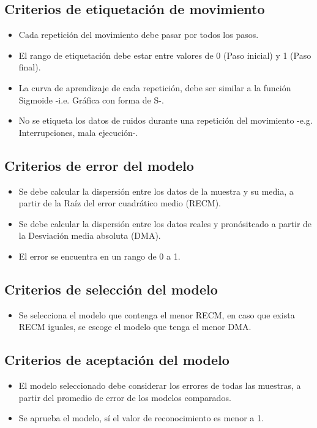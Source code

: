 \subsection{Criterios de etiquetaci\'on de movimiento}
\begin{itemize}
	\item Cada repetici\'on del movimiento debe pasar por todos los pasos.
	\item El rango de etiquetaci\'on debe estar entre valores de 0 (Paso inicial) y 1 (Paso final).
	\item La curva de aprendizaje de cada repetici\'on, debe ser similar a la funci\'on Sigmoide -i.e. Gr\'afica con forma de S-.
	\item No se etiqueta los datos de ruidos durante una repetici\'on del movimiento -e.g. Interrupciones, mala ejecuci\'on-.
\end{itemize}
\subsection{Criterios de error del modelo}
\begin{itemize}
	\item Se debe calcular la dispersi\'on entre los datos de la muestra y su media, a partir de la Ra\'iz del error cuadr\'atico medio (RECM).
	\item Se debe calcular la dispersi\'on entre los datos reales y pron\'ositcado a partir de la Desviaci\'on media absoluta (DMA). 
	\item El error se encuentra en un rango de 0 a 1.
\end{itemize}
\subsection{Criterios de selecci\'on del modelo}
\begin{itemize}
	\item Se selecciona el modelo que contenga el menor RECM, en caso que exista RECM iguales, se escoge el modelo que tenga el menor DMA.
\end{itemize}
\subsection{Criterios de aceptaci\'on del modelo}
\begin{itemize}
	\item El modelo seleccionado debe considerar los errores de todas las muestras, a partir del promedio de error de los modelos comparados.
	\item Se aprueba el modelo, s\'i el valor de reconocimiento es menor a 1.
\end{itemize}
